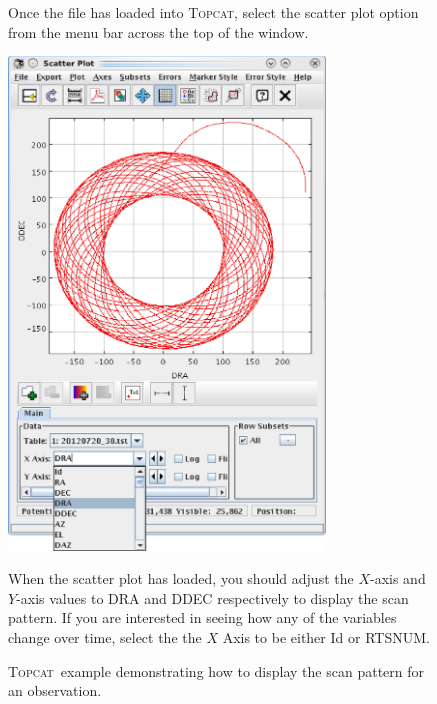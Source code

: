 \documentclass[twoside,11pt]{article}
\newcommand{\htmladdnormallink}[2]{#1}
\newenvironment{latexonly}{}{}
\renewcommand{\_}{\texttt{\symbol{95}}}
\newenvironment{fmpage}[1]{\begin{lrbox}{\fmbox}\begin{minipage}{#1}}{\end{minipage}\end{lrbox}\fbox{\usebox{\fmbox}}}
\newcommand{\topcat}{\htmladdnormallink{\textsc{Topcat}}{http://www.starlink.ac.uk/topcat}}
\begin{document}
\begin{latexonly}
\begin{figure}[ht!]
\begin{center}
\begin{fmpage}{0.95\linewidth}
\begin{minipage}[c]{0.6\linewidth}
\end{minipage}
\hspace{0.3cm}
\begin{minipage}[c]{0.32\linewidth}
Once the file has loaded into \topcat, select the scatter plot option
from the menu bar across the top of the window.
\end{minipage}

\vspace{0.5cm}

\begin{minipage}[c]{0.6\linewidth}
\centering
\includegraphics[width=0.75\textwidth]{sc21_topcat2.eps}
\vspace{0.2cm}
\end{minipage}
\hspace{0.3cm}
\begin{minipage}[c]{0.32\linewidth}
When the scatter plot has loaded, you should adjust the $X$-axis and
$Y$-axis values to DRA and DDEC respectively to display the scan pattern.
If you are interested in seeing how any of the variables change over time,
select the the $X$ Axis to be either Id or RTS\_NUM.
\end{minipage}

\end{fmpage}
\end{center}
\caption{\small \topcat\ example demonstrating how to display the scan pattern
for an observation.}
\label{fig:topcat}
\end{figure}
\end{latexonly}
\end{document}
